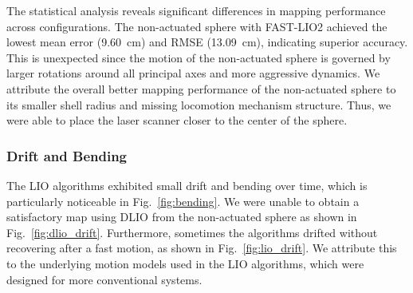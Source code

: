 \documentclass[a4paper, conference]{IEEEtran}
\begin{document}
The statistical analysis reveals significant differences in mapping performance across configurations. 
The non-actuated sphere with FAST-LIO2 achieved the lowest mean error (\SI{9.60}{\centi\meter}) and RMSE (\SI{13.09}{\centi\meter}), indicating superior accuracy. 
This is unexpected since the motion of the non-actuated sphere is governed by larger rotations around all principal axes and more aggressive dynamics.
We attribute the overall better mapping performance of the non-actuated sphere to its smaller shell radius and missing locomotion mechanism structure.
Thus, we were able to place the laser scanner closer to the center of the sphere.

\subsubsection{Drift and Bending}
The LIO algorithms exhibited small drift and bending over time, which is particularly noticeable in Fig.~\ref{fig:bending}. 
We were unable to obtain a satisfactory map using DLIO from the non-actuated sphere as shown in Fig.~\ref{fig:dlio_drift}.
Furthermore, sometimes the algorithms drifted without recovering after a fast motion, as shown in Fig.~\ref{fig:lio_drift}. 
We attribute this to the underlying motion models used in the LIO algorithms, which were designed for more conventional systems.
\end{document}
